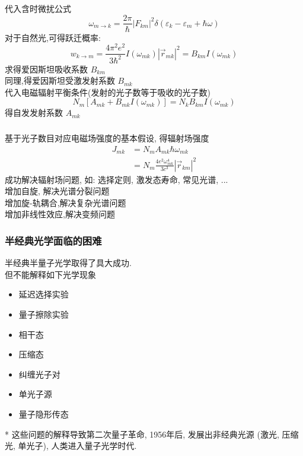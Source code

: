 \begin{frame}
      \frametitle{}
      代入含时微扰公式
      \[ \omega_{m \rightarrow k}=\frac{2 \pi}{\hbar}\left|F_{k m}\right|^{2} \delta\left(\varepsilon_{k}-\varepsilon_{m}+\hbar \omega\right) \]
      对于自然光,可得跃迁概率:
      \[ w_{k \rightarrow m}=\frac{4 \pi^{2} e^{2}}{3 \hbar^{2}} I\left(\omega_{m k}\right)\left|\vec{r}_{m k}\right|^{2} = B_{km} I\left(\omega_{m k}\right)\]
      求得爱因斯坦吸收系数 $B_{km}$ \\ 
      同理,得爱因斯坦受激发射系数 $B_{mk}$  \\ 
      代入电磁辐射平衡条件(发射的光子数等于吸收的光子数) 
      \[N_{m}\left[A_{m k}+B_{m k} I\left(\omega_{m k}\right)\right]=N_{k} B_{k m} I\left(\omega_{m k}\right) \]
      得自发发射系数 $A_{mk}$ 
\end{frame}

\begin{frame}
      \frametitle{}
      基于光子数目对应电磁场强度的基本假设, 得辐射场强度
    \[\begin{aligned}
        J_{m k} &=N_{m} A_{m k} \hbar \omega_{m k} \\
        &=N_{m} \frac{4 e^{2} \omega_{m k}^{4}}{3 c^{3}}\left|\vec{r}_{k m}\right|^{2} 
        \end{aligned} \] {\vspace*{2.3em}}
    成功解决辐射场问题, 如: 选择定则, 激发态寿命, 常见光谱, ... \\ \vspace*{2.0em}
    增加自旋, 解决光谱分裂问题 \\
    增加旋-轨耦合,解决复杂光谱问题 \\ 
    增加非线性效应,解决变频问题 \\
\end{frame}

\begin{frame}
    \frametitle{半经典光学面临的困难}
    半经典半量子光学取得了具大成功. \\ 
    但不能解释如下光学现象
    \begin{itemize}
        \item 延迟选择实验
        \item 量子擦除实验
        \item 相干态
        \item 压缩态
        \item 纠缠光子对
        \item 单光子源
        \item 量子隐形传态
    \end{itemize}
    * 这些问题的解释导致第二次量子革命, 1956年后, 发展出非经典光源 (激光, 压缩光, 单光子), 人类进入量子光学时代.
\end{frame}

